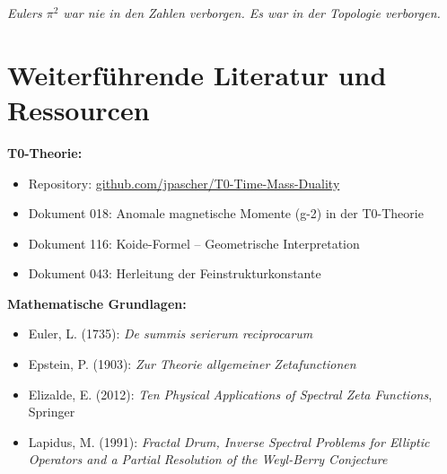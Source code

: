 	\begin{center}
		\large\textit{Eulers $\pi^2$ war nie in den Zahlen verborgen. Es war in der Topologie verborgen.}
	\end{center}
	
	
	\section*{Weiterführende Literatur und Ressourcen}
	
	\textbf{T0-Theorie:}
	\begin{itemize}
		\item Repository: \href{https://github.com/jpascher/T0-Time-Mass-Duality}{github.com/jpascher/T0-Time-Mass-Duality}
		\item Dokument 018: Anomale magnetische Momente (g-2) in der T0-Theorie
		\item Dokument 116: Koide-Formel -- Geometrische Interpretation
		\item Dokument 043: Herleitung der Feinstrukturkonstante
	\end{itemize}
	
	\textbf{Mathematische Grundlagen:}
	\begin{itemize}
		\item Euler, L. (1735): \textit{De summis serierum reciprocarum}
		\item Epstein, P. (1903): \textit{Zur Theorie allgemeiner Zetafunctionen}
		\item Elizalde, E. (2012): \textit{Ten Physical Applications of Spectral Zeta Functions}, Springer
		\item Lapidus, M. (1991): \textit{Fractal Drum, Inverse Spectral Problems for Elliptic Operators and a Partial Resolution of the Weyl-Berry Conjecture}
	\end{itemize}
	
